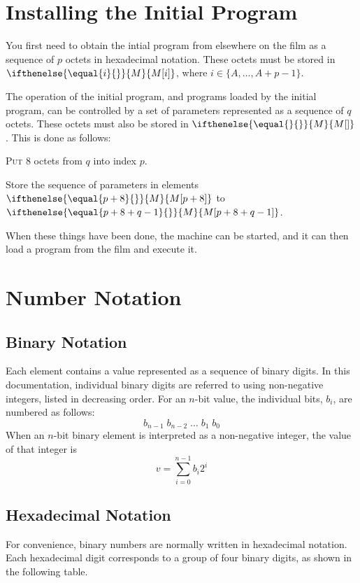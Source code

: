 \documentclass[a4paper,12pt]{article}
\newcommand{\MEM}[1]{\ifthenelse{\equal{#1}{}}{M}{M[#1]}}
\newcommand{\range}[2]{\{#1,\ldots,#2\}}
\newcommand{\proc}[1]{\textsc{#1}}
\theoremstyle{definition}
\begin{document}
\section{Installing the Initial Program}

You first need to obtain the intial program from elsewhere on the film as a sequence of $p$ octets in hexadecimal notation.
These octets must be stored in $\MEM{i}$, where $i \in \range{A}{A+p-1}$.

The operation of the initial program, and programs loaded by the initial program, can be controlled by a set of parameters represented as a sequence of $q$ octets.
These octets must also be stored in $\MEM{}$.
This is done as follows:
\begin{stepnumbers}
  \item \proc{Put} 8 octets from $q$ into index $p$.
  \item Store the sequence of parameters in elements $\MEM{p+8}$ to $\MEM{p+8+q-1}$.
\end{stepnumbers}
When these things have been done, the machine can be started, and it can then load a program from the film and execute it.

\appendix

\section{Number Notation}
\label{sec:number-notation}

\subsection{Binary Notation}
\label{sec:binary-notation}

Each element contains a value represented as a sequence of binary digits.
In this documentation, individual binary digits are referred to using non-negative integers, listed in decreasing order.
For an $n$-bit value, the individual bits, $b_i$, are numbered as follows:
\[ b_{n-1} \; b_{n-2} \; \ldots \; b_{1} \; b_{0} \]
When an $n$-bit binary element is interpreted as a non-negative integer, the value of that integer is
\[
    v = \sum_{i=0}^{n-1} b_{i}2^{i}
\]

\subsection{Hexadecimal Notation}
\label{sec:hexadecimal-notation}

For convenience, binary numbers are normally written in hexadecimal notation.
Each hexadecimal digit corresponds to a group of four binary digits, as shown in the following table.
\end{document}
